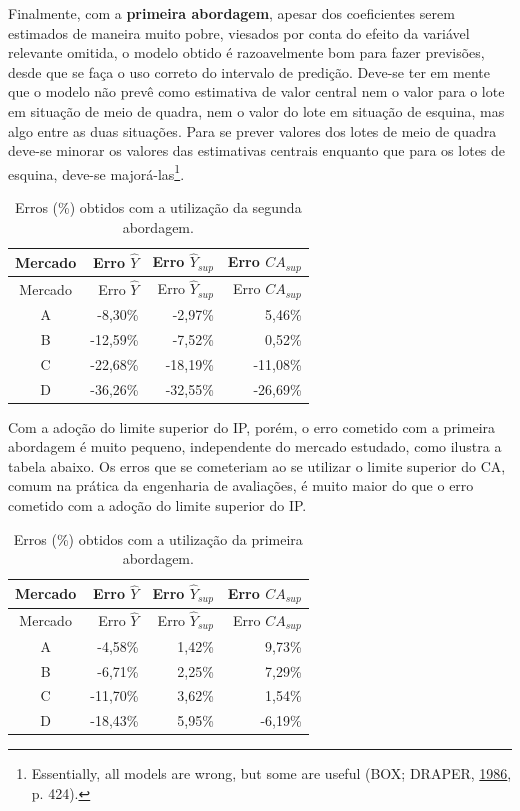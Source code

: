 \documentclass[
  a4paper, 11pt]{article}
\begin{document}
Finalmente, com a \textbf{primeira abordagem}, apesar dos coeficientes
serem estimados de maneira muito pobre, viesados por conta do efeito da
variável relevante omitida, o modelo obtido é razoavelmente bom para
fazer previsões, desde que se faça o uso correto do intervalo de
predição. Deve-se ter em mente que o modelo não prevê como estimativa de
valor central nem o valor para o lote em situação de meio de quadra, nem
o valor do lote em situação de esquina, mas algo entre as duas
situações. Para se prever valores dos lotes de meio de quadra deve-se
minorar os valores das estimativas centrais enquanto que para os lotes
de esquina, deve-se majorá-las\footnote{Essentially, all models are
  wrong, but some are useful (BOX; DRAPER,
  \protect\hyperlink{ref-Box1986}{1986}, p. 424).}.

\begin{longtable}[]{@{}crrr@{}}
\caption{Erros (\%) obtidos com a utilização da segunda
abordagem.}\tabularnewline
\toprule
Mercado & Erro \(\hat Y\) & Erro \(\hat Y_{sup}\) & Erro
\(CA_{sup}\)\tabularnewline
\midrule
\endfirsthead
\toprule
Mercado & Erro \(\hat Y\) & Erro \(\hat Y_{sup}\) & Erro
\(CA_{sup}\)\tabularnewline
\midrule
\endhead
A & -8,30\% & -2,97\% & 5,46\%\tabularnewline
B & -12,59\% & -7,52\% & 0,52\%\tabularnewline
C & -22,68\% & -18,19\% & -11,08\%\tabularnewline
D & -36,26\% & -32,55\% & -26,69\%\tabularnewline
\bottomrule
\end{longtable}

Com a adoção do limite superior do IP, porém, o erro cometido com a
primeira abordagem é muito pequeno, independente do mercado estudado,
como ilustra a tabela abaixo. Os erros que se cometeriam ao se utilizar
o limite superior do CA, comum na prática da engenharia de avaliações, é
muito maior do que o erro cometido com a adoção do limite superior do
IP.

\begin{longtable}[]{@{}crrr@{}}
\caption{Erros (\%) obtidos com a utilização da primeira
abordagem.}\tabularnewline
\toprule
Mercado & Erro \(\hat Y\) & Erro \(\hat Y_{sup}\) & Erro
\(CA_{sup}\)\tabularnewline
\midrule
\endfirsthead
\toprule
Mercado & Erro \(\hat Y\) & Erro \(\hat Y_{sup}\) & Erro
\(CA_{sup}\)\tabularnewline
\midrule
\endhead
A & -4,58\% & 1,42\% & 9,73\%\tabularnewline
B & -6,71\% & 2,25\% & 7,29\%\tabularnewline
C & -11,70\% & 3,62\% & 1,54\%\tabularnewline
D & -18,43\% & 5,95\% & -6,19\%\tabularnewline
\bottomrule
\end{longtable}

\newpage
\end{document}
